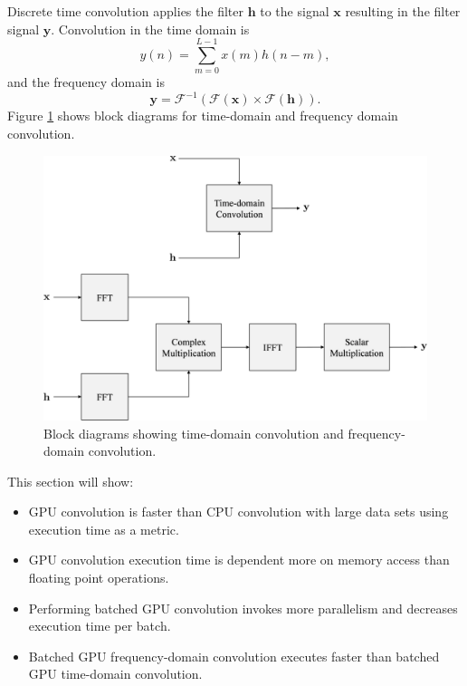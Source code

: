 Discrete time convolution applies the filter $\mathbf{h}$ to the signal $\mathbf{x}$ resulting in the filter signal $\mathbf{y}$.
Convolution in the time domain is
\begin{equation}
y(n) = \sum^{L-1}_{m=0} x(m) h(n-m),
  \label{eq:simple_conv_time}
\end{equation}
and the frequency domain is
\begin{equation}
\mathbf{y} = \mathscr{F}^{-1}(\mathscr{F}(\mathbf{x})\times\mathscr{F}(\mathbf{h})).
  \label{eq:simple_conv_freq}
\end{equation}
Figure \ref{fig:freq_time_block} shows block diagrams for time-domain and frequency domain convolution.
\begin{figure}
	\centering\includegraphics[width=10.28in/100*55]{figures/gpu_convolution/convBlock.pdf}
	\caption{Block diagrams showing time-domain convolution and frequency-domain convolution.}
	\label{fig:freq_time_block}
\end{figure}
This section will show:
\begin{itemize}
\item GPU convolution is faster than CPU convolution with large data sets using execution time as a metric.
\item GPU convolution execution time is dependent more on memory access than floating point operations.
\item Performing batched GPU convolution invokes more parallelism and decreases execution time per batch.
\item Batched GPU frequency-domain convolution executes faster than batched GPU time-domain convolution.
\end{itemize}

